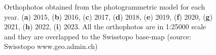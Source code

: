 \begin{figure}
{    }
    \caption{Orthophotos obtained from the photogrammetric model for each year.
        (\textbf{a}) 2015, (\textbf{b}) 2016, (\textbf{c}) 2017, (\textbf{d}) 2018,
        (\textbf{e}) 2019, (\textbf{f}) 2020, (\textbf{g}) 2021, (\textbf{h}) 2022, (\textbf{i})
        2023. All the orthophotos are in 1:25000 scale and they are overlapped to the Swisstopo base-map (source: Swisstopo
        www.geo.admin.ch)}
    \label{fig:3:ortophoto}
\end{figure}

